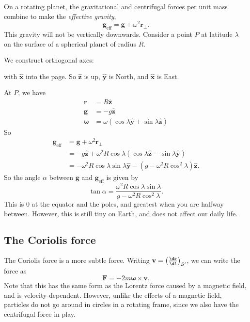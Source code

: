 \documentclass[a4paper]{article}
\begin{document}
On a rotating planet, the gravitational and centrifugal forces per unit mass combine to make the \emph{effective gravity},
\[
  \mathbf{g}_{\text{eff}} = \mathbf{g} + \omega^2 \mathbf{r}_\bot.
\]
This gravity will not be vertically downwards. Consider a point $P$ at latitude $\lambda$ on the surface of a spherical planet of radius $R$.

We construct orthogonal axes:
\begin{center}
\end{center}
with $\hat{\mathbf{x}}$ into the page. So $\hat{\mathbf{z}}$ is up, $\hat{\mathbf{y}}$ is North, and $\hat{\mathbf{x}}$ is East.

At $P$, we have
\begin{align*}
  \mathbf{r} &= R\hat{\mathbf{z}}\\
  \mathbf{g} &= -g\hat{\mathbf{z}}\\
  \boldsymbol\omega &= \omega(\cos\lambda \hat{\mathbf{y}} + \sin \lambda \hat{\mathbf{z}})
\end{align*}
So
\begin{align*}
  \mathbf{g}_{\mathrm{eff}} &= \mathbf{g} + \omega^2 \mathbf{r}_\bot \\
  &= -g\hat{\mathbf{z}} + \omega^2 R\cos\lambda(\cos\lambda\hat{\mathbf{z}} - \sin\lambda\hat{\mathbf{y}})\\
  &= -\omega^2 R\cos\lambda\sin\lambda\hat{\mathbf{y}} - (g - \omega^2 R\cos^2\lambda)\hat{\mathbf{z}}.
\end{align*}
So the angle $\alpha$ between $\mathbf{g}$ and $\mathbf{g}_{\text{eff}}$ is given by
\[
  \tan \alpha = \frac{\omega^2 R\cos\lambda\sin\lambda}{g - \omega^2R\cos^2\lambda}.
\]
This is 0 at the equator and the poles, and greatest when you are halfway between. However, this is still tiny on Earth, and does not affect our daily life.

\subsection{The Coriolis force}
The Coriolis force is a more subtle force. Writing $\mathbf{v} = \left(\frac{\d \mathbf{r}}{\d t}\right)_{S'}$, we can write the force as
\[
  \mathbf{F} = -2m\boldsymbol\omega\times \mathbf{v}.
\]
Note that this has the same form as the Lorentz force caused by a magnetic field, and is velocity-dependent. However, unlike the effects of a magnetic field, particles do not go around in circles in a rotating frame, since we also have the centrifugal force in play.
\end{document}
